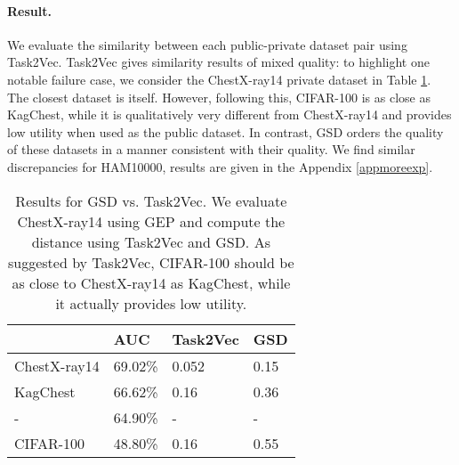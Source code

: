 \documentclass[11pt]{article}
\begin{document}
\paragraph{Result.} We evaluate the similarity between each public-private dataset pair using Task2Vec. Task2Vec gives similarity results of mixed quality: to highlight one notable failure case, we consider the ChestX-ray14 private dataset in Table \ref{more task2vec}. 
The closest dataset is itself. However, following this, CIFAR-100 is as close as KagChest, while it is qualitatively very different from ChestX-ray14 and provides low utility when used as the public dataset.
In contrast, GSD orders the quality of these datasets in a manner consistent with their quality.
We find similar discrepancies for HAM10000, results are given in the Appendix \ref{appmoreexp}.

\begin{table}[htbp]
    \caption{Results for GSD vs. Task2Vec. We evaluate ChestX-ray14 using GEP and compute the distance using Task2Vec and GSD. As suggested by Task2Vec, CIFAR-100 should be as close to ChestX-ray14 as KagChest, while it actually provides low utility.}
    \centering
    \begin{tabular}{llll}
    \hline
                 & AUC     & Task2Vec & GSD \\ \hline
    ChestX-ray14 & 69.02\% & 0.052             & 0.15         \\
    KagChest     & 66.62\% & 0.16              & 0.36         \\
    -            & 64.90\% & -                 & -            \\
    CIFAR-100    & 48.80\% & 0.16              & 0.55         \\ \hline
    \end{tabular}
    
    \label{more task2vec}
\end{table}

\end{document}
